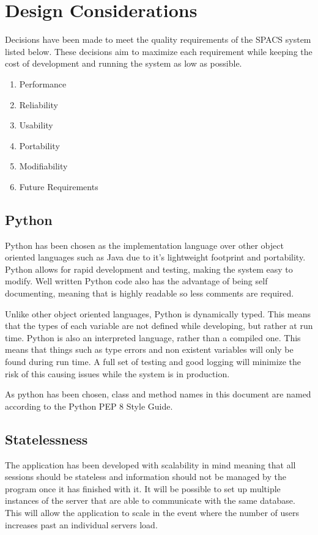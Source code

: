 \section{Design Considerations}

\par
Decisions have been made to meet the quality requirements of the SPACS system listed below. These decisions aim to maximize each requirement while keeping the cost of development and running the system as low as possible.

\begin{enumerate}
	\item Performance
	\item Reliability
	\item Usability
	\item Portability
	\item Modifiability
	\item Future Requirements
\end{enumerate}

\subsection{Python}
\par
Python has been chosen as the implementation language over other object oriented languages such as Java due to it's lightweight footprint and portability. Python allows for rapid development and testing, making the system easy to modify. Well written Python code also has the advantage of being self documenting, meaning that is highly readable so less comments are required.

\par
Unlike other object oriented languages, Python is dynamically typed. This means that the types of each variable are not defined while developing, but rather at run time. Python is also an interpreted language, rather than a compiled one. This means that things such as type errors and non existent variables will only be found during run time. A full set of testing and good logging will minimize the risk of this causing issues while the system is in production.

\par
As python has been chosen, class and method names in this document are named according to the Python PEP 8 Style Guide.

\subsection{Statelessness}
\par
The application has been developed with scalability in mind meaning that all sessions should be stateless and information should not be managed by the program once it has finished with it. It will be possible to set up multiple instances of the server that are able to communicate with the same database. This will allow the application to scale in the event where the number of users increases past an individual servers load.

